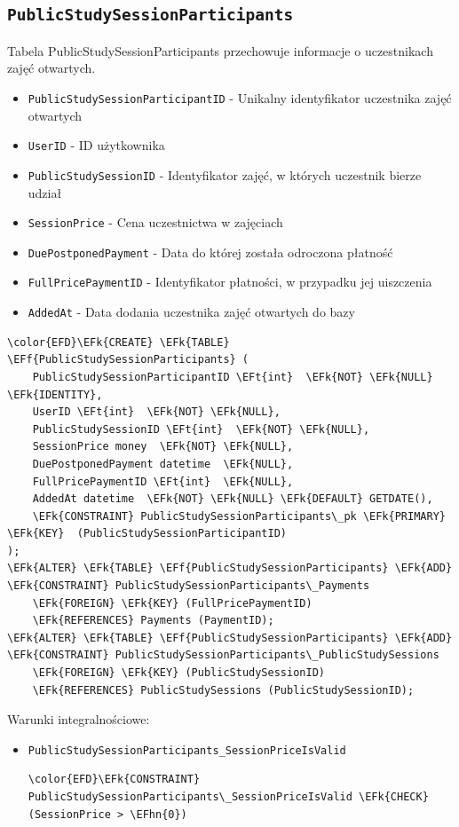 \documentclass[11pt]{article}
\newcommand{\EFk}[1]{\textcolor{EFk}{\textbf{#1}}} %
\newcommand{\EFf}[1]{\textcolor{EFf}{#1}} %
\newcommand{\EFt}[1]{\textcolor{EFt}{\textbf{#1}}} %
\newcommand{\EFhn}[1]{\textcolor{EFhn}{#1}} %
\begin{document}
\subsection{\texttt{PublicStudySessionParticipants}}
\label{sec:org740c53b}
Tabela PublicStudySessionParticipants przechowuje informacje o uczestnikach zajęć otwartych.
\begin{itemize}
\item \texttt{PublicStudySessionParticipantID} - Unikalny identyfikator uczestnika zajęć otwartych
\item \texttt{UserID} - ID użytkownika
\item \texttt{PublicStudySessionID} - Identyfikator zajęć, w których uczestnik bierze udział
\item \texttt{SessionPrice} - Cena uczestnictwa w zajęciach
\item \texttt{DuePostponedPayment} - Data do której została odroczona płatność
\item \texttt{FullPricePaymentID} - Identyfikator płatności, w przypadku jej uiszczenia
\item \texttt{AddedAt} - Data dodania uczestnika zajęć otwartych do bazy
\end{itemize}
\begin{Code}
\begin{Verbatim}
\color{EFD}\EFk{CREATE} \EFk{TABLE} \EFf{PublicStudySessionParticipants} (
    PublicStudySessionParticipantID \EFt{int}  \EFk{NOT} \EFk{NULL} \EFk{IDENTITY},
    UserID \EFt{int}  \EFk{NOT} \EFk{NULL},
    PublicStudySessionID \EFt{int}  \EFk{NOT} \EFk{NULL},
    SessionPrice money  \EFk{NOT} \EFk{NULL},
    DuePostponedPayment datetime  \EFk{NULL},
    FullPricePaymentID \EFt{int}  \EFk{NULL},
    AddedAt datetime  \EFk{NOT} \EFk{NULL} \EFk{DEFAULT} GETDATE(),
    \EFk{CONSTRAINT} PublicStudySessionParticipants\_pk \EFk{PRIMARY} \EFk{KEY}  (PublicStudySessionParticipantID)
);
\EFk{ALTER} \EFk{TABLE} \EFf{PublicStudySessionParticipants} \EFk{ADD} \EFk{CONSTRAINT} PublicStudySessionParticipants\_Payments
    \EFk{FOREIGN} \EFk{KEY} (FullPricePaymentID)
    \EFk{REFERENCES} Payments (PaymentID);
\EFk{ALTER} \EFk{TABLE} \EFf{PublicStudySessionParticipants} \EFk{ADD} \EFk{CONSTRAINT} PublicStudySessionParticipants\_PublicStudySessions
    \EFk{FOREIGN} \EFk{KEY} (PublicStudySessionID)
    \EFk{REFERENCES} PublicStudySessions (PublicStudySessionID);
\end{Verbatim}
\end{Code}
Warunki integralnościowe:


\begin{itemize}
\item \texttt{PublicStudySessionParticipants\_SessionPriceIsValid}
\begin{Code}
\begin{Verbatim}
\color{EFD}\EFk{CONSTRAINT} PublicStudySessionParticipants\_SessionPriceIsValid \EFk{CHECK}
(SessionPrice > \EFhn{0})
\end{Verbatim}
\end{Code}
\end{itemize}
\end{document}
